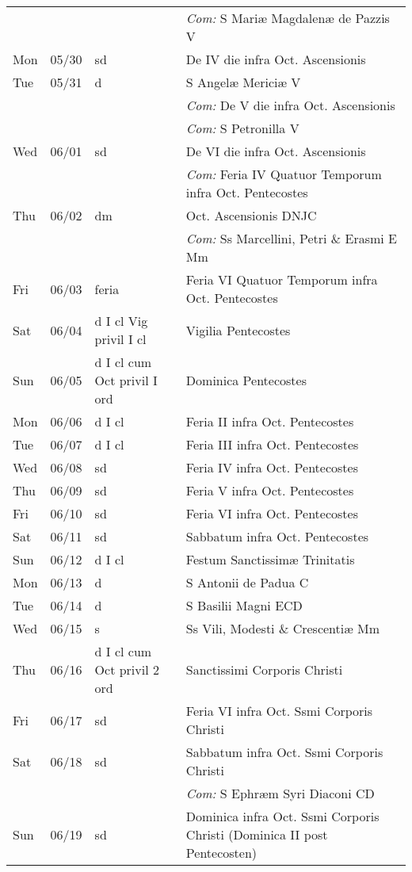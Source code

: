 \documentclass[10pt]{article}
\begin{document}
\begin{longtable}{ l l l l }
 & & & \textit{Com:} S Mariæ Magdalenæ de Pazzis V\\
Mon & 05/30 & sd & De IV die infra Oct. Ascensionis\\
Tue & 05/31 & d & S Angelæ Mericiæ V\\
 & & & \textit{Com:} De V die infra Oct. Ascensionis\\
 & & & \textit{Com:} S Petronilla V\\
Wed & 06/01 & sd & De VI die infra Oct. Ascensionis\\
 & & & \textit{Com:} Feria IV Quatuor Temporum infra Oct. Pentecostes\\
Thu & 06/02 & dm & Oct. Ascensionis DNJC\\
 & & & \textit{Com:} Ss Marcellini, Petri \& Erasmi E Mm\\
Fri & 06/03 & feria & Feria VI Quatuor Temporum infra Oct. Pentecostes\\
Sat & 06/04 & d I cl Vig privil I cl & Vigilia Pentecostes\\
Sun & 06/05 & d I cl cum Oct privil I ord & Dominica Pentecostes\\
Mon & 06/06 & d I cl & Feria II infra Oct. Pentecostes\\
Tue & 06/07 & d I cl & Feria III infra Oct. Pentecostes\\
Wed & 06/08 & sd & Feria IV infra Oct. Pentecostes\\
Thu & 06/09 & sd & Feria V infra Oct. Pentecostes\\
Fri & 06/10 & sd & Feria VI infra Oct. Pentecostes\\
Sat & 06/11 & sd & Sabbatum infra Oct. Pentecostes\\
Sun & 06/12 & d I cl & Festum Sanctissimæ Trinitatis\\
Mon & 06/13 & d & S Antonii de Padua C\\
Tue & 06/14 & d & S Basilii Magni ECD\\
Wed & 06/15 & s & Ss Vili, Modesti \& Crescentiæ Mm\\
Thu & 06/16 & d I cl cum Oct privil 2 ord & Sanctissimi Corporis Christi\\
Fri & 06/17 & sd & Feria VI infra Oct. Ssmi Corporis Christi\\
Sat & 06/18 & sd & Sabbatum infra Oct. Ssmi Corporis Christi\\
 & & & \textit{Com:} S Ephræm Syri Diaconi CD\\
Sun & 06/19 & sd & Dominica infra Oct. Ssmi Corporis Christi (Dominica II post Pentecosten)\\

\end{longtable}
\end{document}
